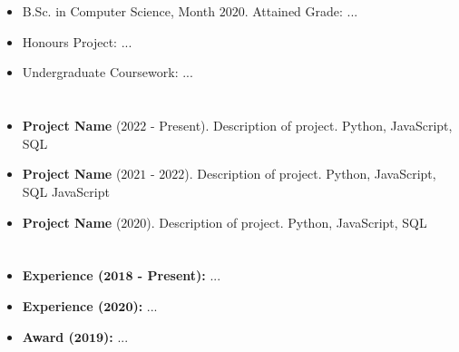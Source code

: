 \documentclass{article}[10pt]
\begin{document}
\section*{\underline{}}

{ \hfill
   \hfill 
  }

\begin{itemize}
	\item B.Sc. in Computer Science, Month $2020$. Attained Grade: ...
	\item Honours Project: ...
	\item Undergraduate Coursework: ...
\end{itemize}

\section*{\underline{}}

\begin{itemize}
	\item \textbf{Project Name} ($2022$ - Present). Description of project. Python, JavaScript, SQL
	\item \textbf{Project Name} ($2021$ - $2022$). Description of project. Python, JavaScript, SQL JavaScript
	\item \textbf{Project Name} ($2020$). Description of project. Python, JavaScript, SQL
\end{itemize}

\section*{\underline{}}

\begin{itemize}
	\item \textbf{Experience ($\bm{2018}$ - Present):} ...
	\item \textbf{Experience ($\bm{2020}$):} ...
	\item \textbf{Award ($\bm{2019}$):} ...
\end{itemize}
\end{document}
